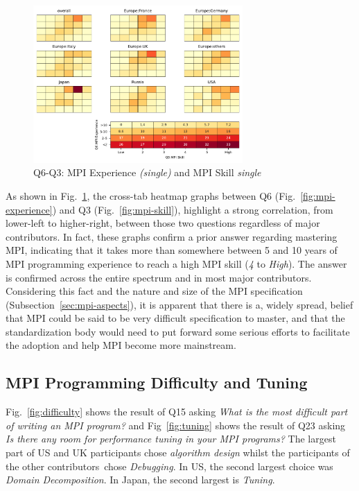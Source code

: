 \documentclass[preprint,5p,times]{elsarticle}
\def\myquote#1{{\it #1}}
\def\countries{contributors\xspace{}}%
\def\mcountries{major contributors\xspace{}}%
\begin{document}
\begin{figure}[htb]
\begin{center}
\includegraphics[width=8.0cm]{Figs/Q6-Q3.pdf}
\caption{Q6-Q3: MPI Experience {\it(single)} and MPI Skill {\it single}}
\label{fig:experience-and-skill}
\end{center}
\end{figure}

As shown in Fig.~\ref{fig:experience-and-skill}, the cross-tab heatmap graphs
between Q6 (Fig.~\ref{fig:mpi-experience}) and Q3 (Fig.~\ref{fig:mpi-skill}),
highlight a strong correlation, from lower-left to higher-right, between those
two questions regardless of \mcountries. In fact, these graphs confirm a prior
answer regarding mastering MPI, indicating that it takes more than somewhere
between 5 and 10 years of MPI programming experience to reach a high MPI skill
(\myquote{4} to \myquote{High}). The answer is confirmed across the entire
spectrum and in most \mcountries.
Considering this fact and the nature and size of the MPI specification
(Subsection~\ref{sec:mpi-aspects}), it is apparent that there is a, widely
spread, belief that MPI could be said to be very difficult specification to
master, and that the standardization body would need to put forward some serious
efforts to facilitate the adoption and help MPI become more mainstream.

\subsection{MPI Programming Difficulty and Tuning}

Fig.~\ref{fig:difficulty} shows the result of Q15 asking \myquote{What is the
most difficult part of writing an MPI program?} and
Fig~\ref{fig:tuning} shows the result of Q23 asking \myquote{Is there any
room for performance tuning in your MPI programs?} The largest part
of US and UK participants chose \myquote{algorithm design} whilst the
participants of the other \countries\  chose
\myquote{Debugging}. In US, the second largest choice was
\myquote{Domain Decomposition}. In Japan, the second largest is
\myquote{Tuning}.
\end{document}
